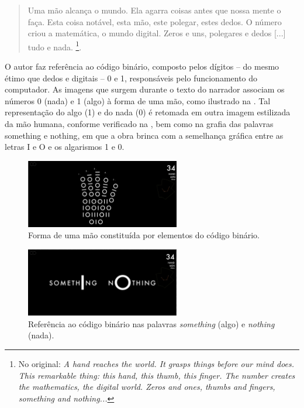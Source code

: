 \documentclass[portuguese]{textolivre}
\begin{document}
\begin{quote}
Uma mão alcança o mundo. Ela agarra coisas antes que nossa mente o faça. Esta coisa notável, esta mão, este polegar, estes dedos. O número criou a matemática, o mundo digital. Zeros e uns, polegares e dedos [...] tudo e nada. \cite[n. p., tradução nossa]{clark2010}\footnote{No original: \emph{A hand reaches the world. It grasps things before our mind does. This remarkable thing: this hand, this thumb, this finger. The number creates the mathematics, the digital world. Zeros and ones, thumbs and fingers, something and nothing...}}.
\end{quote}

O autor faz referência ao código binário, composto pelos dígitos – do mesmo étimo que dedos e digitais – 0 e 1, responsáveis pelo funcionamento do computador. As imagens que surgem durante o texto do narrador associam os números 0 (nada) e 1 (algo) à forma de uma mão, como ilustrado na . Tal representação do algo (1) e do nada (0) é retomada em outra imagem estilizada da mão humana, conforme verificado na , bem como na grafia das palavras something e nothing, em que a obra brinca com a semelhança gráfica entre as letras I e O e os algarismos 1 e 0.

\begin{figure}[htbp]
 \centering
 \includegraphics[width=0.6\textwidth]{Fig13[1].jpg}
 \caption{Forma de uma mão constituída por elementos do código binário.}
 \label{fig13}
\end{figure}

\begin{figure}[htbp]
 \centering
 \includegraphics[width=0.6\textwidth]{Fig14[1].jpg}
 \caption{Referência ao código binário nas palavras \emph{something} (algo) e \emph{nothing} (nada).}
 \label{fig14}
\end{figure}
\end{document}

